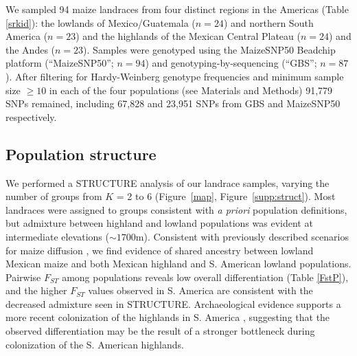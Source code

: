We sampled 94 maize landraces from four distinct regions in the Americas (Table \ref{srkid}): the lowlands of Mexico/Guatemala ($n=24$) and northern South America ($n=23$) and the highlands of the Mexican Central Plateau ($n=24$) and the Andes ($n=23$). 
Samples were genotyped using the MaizeSNP50 Beadchip platform (``MaizeSNP50''; $n=94$) and genotyping-by-sequencing (``GBS''; $n=87$). 
After filtering for Hardy-Weinberg genotype frequencies and minimum sample size $\geq10$ in each of the four populations (see Materials and Methods) 91,779 SNPs remained, including 67,828 and 23,951 SNPs from GBS and MaizeSNP50 respectively.  

\subsection*{Population structure}

We performed a {\sf STRUCTURE} analysis \cite[]{Pritchard_2000_10835412,Falush_2003_12930761} of our landrace samples, varying the number of groups from $K$ = 2 to 6 (Figure~\ref{map}, Figure~\ref{supp:struct}). 
Most landraces were assigned to groups consistent with \emph{a priori} population definitions, but admixture between highland and lowland populations was evident at intermediate elevations ($\sim1700$m).  Consistent with previously described scenarios for maize diffusion \cite[]{Piperno_2006_69}, we find evidence of shared ancestry between lowland Mexican maize and both Mexican highland and S. American lowland populations.  Pairwise $F_{ST}$ among populations reveals low overall differentiation (Table \ref{FstP}), and the higher $F_{ST}$ values observed in S. America are consistent with the decreased admixture seen in {\sf STRUCTURE}.  Archaeological evidence supports a more recent colonization of the highlands in S. America  \cite[]{Piperno_2006_69,Perry_2006_16511492,Grobman_2012_22307642}, suggesting that the observed differentiation may be the result of a stronger bottleneck during colonization of the S. American highlands.  


